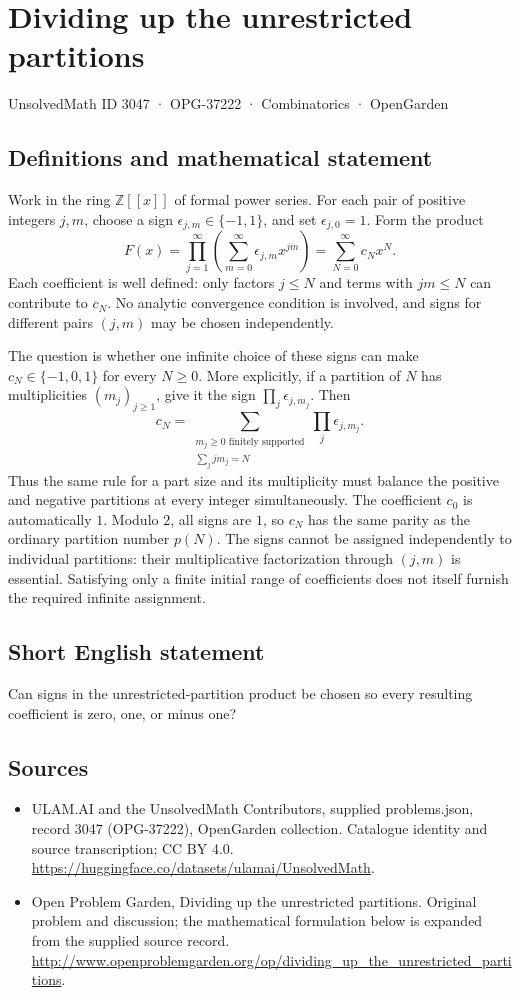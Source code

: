 \documentclass[11pt,a4paper]{article}
\begin{document}
\section*{Dividing up the unrestricted partitions}\label{3047}
{\small UnsolvedMath ID 3047 · OPG-37222 · Combinatorics · OpenGarden}
\subsection{Definitions and mathematical statement}
Work in the ring $\mathbb Z[[x]]$ of formal power series. For each pair
of positive integers $j,m$, choose a sign $\epsilon_{j,m}\in\{-1,1\}$,
and set $\epsilon_{j,0}=1$. Form the product
\[
 F(x)=\prod_{j=1}^{\infty}\left(\sum_{m=0}^{\infty}
                      \epsilon_{j,m}x^{jm}\right)
      =\sum_{N=0}^{\infty}c_Nx^N.
\]
Each coefficient is well defined: only factors $j\le N$ and terms with
$jm\le N$ can contribute to $c_N$. No analytic convergence condition is
involved, and signs for different pairs $(j,m)$ may be chosen independently.

The question is whether one infinite choice of these signs can make
$c_N\in\{-1,0,1\}$ for every $N\ge0$. More explicitly, if a partition
of $N$ has multiplicities $(m_j)_{j\ge1}$, give it the sign
$\prod_j\epsilon_{j,m_j}$. Then
\[
 c_N=\sum_{\substack{m_j\ge0\text{ finitely supported}\\
                       \sum_jjm_j=N}}\prod_j\epsilon_{j,m_j}.
\]
Thus the same rule for a part size and its multiplicity must balance the
positive and negative partitions at every integer simultaneously. The
coefficient $c_0$ is automatically $1$. Modulo $2$, all signs are $1$, so
$c_N$ has the same parity as the ordinary partition number $p(N)$.
The signs cannot be assigned independently to individual partitions:
their multiplicative factorization through $(j,m)$ is essential. Satisfying
only a finite initial range of coefficients does not itself furnish the
required infinite assignment.
\subsection{Short English statement}
Can signs in the unrestricted-partition product be chosen so every resulting coefficient is zero, one, or minus one?
\subsection{Sources}
\begin{itemize}
\item[S1] ULAM.AI and the UnsolvedMath Contributors, supplied problems.json, record 3047 (OPG-37222), OpenGarden collection. Catalogue identity and source transcription; CC BY 4.0.
\url{https://huggingface.co/datasets/ulamai/UnsolvedMath}.
\item[S2] Open Problem Garden, Dividing up the unrestricted partitions. Original problem and discussion; the mathematical formulation below is expanded from the supplied source record.
\url{http://www.openproblemgarden.org/op/dividing_up_the_unrestricted_partitions}.
\end{itemize}
\end{document}

